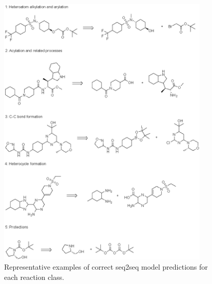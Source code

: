 \begin{figure}
  \centering
  \includegraphics[width=0.9\textwidth]{Images/ret_seq2seq_correct.png}
  \caption{Representative examples of correct seq2seq model predictions for each reaction class.}
  \label{fig:ret_table2}
\end{figure}

